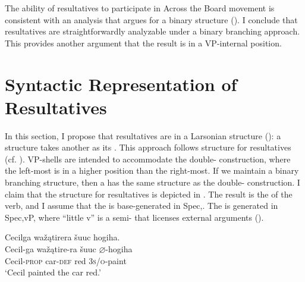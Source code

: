 \documentclass[output=paper]{LSP/langsci}
\begin{document}
The ability of  resultatives to participate in Across the Board movement is consistent with an analysis that argues for a binary structure (\citealt{Bowers1997}). I conclude that  resultatives are straightforwardly analyzable under a binary branching approach. This provides another argument that the result is in a VP-internal position.
 
\section{Syntactic Representation of  Resultatives}\label{sec:rosen:4}
 
In this section, I propose that resultatives are in a Larsonian  structure (\citealt{Larson1988}): a  structure takes another  as its . This approach follows  structure for  resultatives (cf. \citealt{Hoekstra1988,Carrier1992,LevinRappaportHovav1995}).  VP-shells are intended to accommodate the double- construction, where the left-most  is in a higher position than the right-most. If we maintain a binary branching structure, then a  has the same structure as the double- construction. I claim that the structure for  resultatives is depicted in . The result  is the  of the verb, and I assume that the  is base-generated in Spec,. The  is generated in Spec,vP, where ``little v'' is a semi- that licenses external arguments (\citealt{Chomsky1995}).

\begin{exe}
\ex\label{ex:rosen:27}
\begin{xlist}

\ex \glll Cecilga wažątirera šuuc hogiha. \\
Cecil-ga  wažątire-ra šuuc {$\varnothing$}-hogiha \\
Cecil-\textsc{prop} car-\textsc{def} red \textsc{3s/o}-paint\\
\glt `Cecil painted the car red.'

\ex 
{\hspace{1em}}\newline
{}
\end{xlist}
\end{exe}
\end{document}
